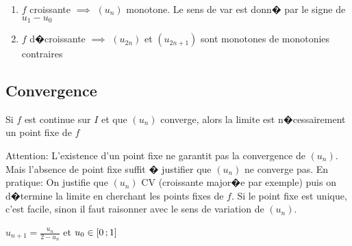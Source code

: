 \begin{prop}
\begin{enumerate}
  \item $f$ croissante $\implies$ $(u_n)$ monotone. Le sens de var est
    donn� par le signe de $u_1-u_0$
  \item $f$ d�croissante $\implies$ $(u_{2n})$ et $(u_{2n+1})$ sont
    monotones de monotonies contraires
\end{enumerate}
\end{prop}

\subsection{Convergence}
\begin{theo}Si $f$ est continue sur $I$ et que $(u_n)$ converge, alors la
  limite est n�cessairement un point fixe de $f$
\end{theo}
Attention: L'existence d'un point fixe ne garantit pas la convergence
de $(u_n)$. Mais l'absence de point fixe suffit � justifier que $(u_n)$
ne converge pas.
En pratique: On justifie que $(u_n)$ CV (croissante major�e par
exemple) puis on d�termine la limite en cherchant les points fixes de
$f$. Si le point fixe est unique, c'est facile, sinon il faut
raisonner avec le sens de variation de $(u_n)$.

\exemple $u_{n+1}=\frac{u_n}{2-u_n}$ et $u_0 \in \left[ 0\, ; 1 \right]$
